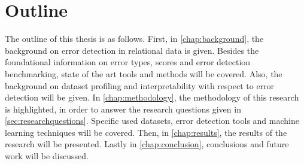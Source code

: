 \section{Outline}
\label{sec:outline}
The outline of this thesis is as follows. 
First, in \autoref{chap:background}, the background on error detection in relational data is given. Besides the foundational information on error types, scores and error detection benchmarking, state of the art tools and methods will be covered. Also, the background on dataset profiling and interpretability with respect to error detection will be given. 
In \autoref{chap:methodology}, the methodology of this research is highlighted, in order to answer the research questions given in \autoref{sec:researchquestions}. Specific used datasets, error detection tools and machine learning techniques will be covered.
Then, in \autoref{chap:results}, the results of the research will be presented. 
Lastly in \autoref{chap:conclusion}, conclusions and future work will be discussed.